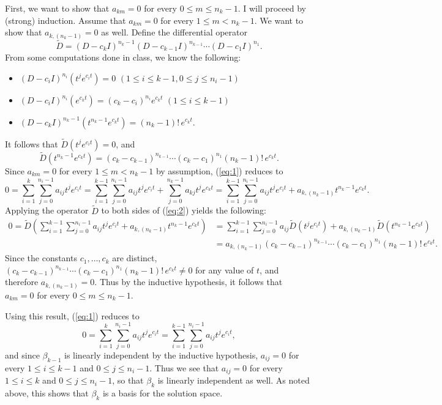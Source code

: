 \documentclass[12pt]{article}
\begin{document}
\begin{enumerate}
First, we want to show that $a_{km} = 0$ for every $0 \leq m \leq n_k-1$. I will proceed by (strong) induction. Assume that $a_{km} = 0$ for every $1 \leq m < n_k-1$. We want to show that $a_{k,(n_k-1)} = 0$ as well. Define the differential operator
\begin{equation*}
\widetilde{D} = (D-c_kI)^{n_k-1}(D-c_{k-1}I)^{n_{k-1}} \cdots (D-c_1I)^{n_1}.
\end{equation*}
From some computations done in class, we know the following:
\begin{itemize}
\item
$(D-c_iI)^{n_i}(t^je^{c_it}) = 0$ $(1 \leq i \leq k-1, 0 \leq j \leq n_i-1)$
\item
$(D-c_iI)^{n_i}(e^{c_kt}) = (c_k - c_i)^{n_i} e^{c_kt}$ $(1 \leq i \leq k-1)$
\item
$(D-c_kI)^{n_k-1}(t^{n_k-1}e^{c_kt}) = (n_k-1)! \, e^{c_kt}$.
\end{itemize}
It follows that $\widetilde{D}(t^je^{c_it}) = 0$, and
\begin{equation*}
\widetilde{D}(t^{n_k-1}e^{c_kt}) = (c_k-c_{k-1})^{n_{k-1}} \cdots (c_k-c_1)^{n_1} (n_k-1)! \, e^{c_kt}.
\end{equation*}
Since $a_{km} = 0$ for every $1 \leq m < n_k-1$ by assumption, (\ref{eq:1}) reduces to
\begin{equation} \label{eq:2}
0 = \sum_{i=1}^k \sum_{j=0}^{n_i-1} a_{ij} t^je^{c_it} = \sum_{i=1}^{k-1} \sum_{j=0}^{n_i-1} a_{ij} t^je^{c_it} + \sum_{j=0}^{n_k-1} a_{kj}t^j e^{c_kt} = \sum_{i=1}^{k-1} \sum_{j=0}^{n_i-1} a_{ij} t^je^{c_it} + a_{k,(n_k-1)}t^{n_k-1} e^{c_kt}.
\end{equation}
Applying the operator $\widetilde{D}$ to both sides of (\ref{eq:2}) yields the following:
\begin{align*}
0 = \widetilde{D}\left(\sum_{i=1}^{k-1} \sum_{j=0}^{n_i-1} a_{ij} t^je^{c_it} + a_{k,(n_k-1)}t^{n_k-1} e^{c_kt}\right)
&= \sum_{i=1}^{k-1} \sum_{j=0}^{n_i-1} a_{ij} \widetilde{D}(t^je^{c_it}) + a_{k,(n_k-1)}\widetilde{D}(t^{n_k-1} e^{c_kt}) \\
&= a_{k,(n_k-1)} (c_k-c_{k-1})^{n_{k-1}} \cdots (c_k-c_1)^{n_1} (n_k-1)! \, e^{c_kt}.
\end{align*}
Since the constants $c_1, \dots, c_k$ are distinct, $(c_k-c_{k-1})^{n_{k-1}} \cdots (c_k-c_1)^{n_1} (n_k-1)! \, e^{c_kt} \neq 0$ for any value of $t$, and therefore $a_{k,(n_k-1)} = 0$. Thus by the inductive hypothesis, it follows that $a_{km} = 0$ for every $0 \leq m \leq n_k-1$.

Using this result, (\ref{eq:1}) reduces to
\begin{equation*}
0 = \sum_{i=1}^k \sum_{j=0}^{n_i-1} a_{ij} t^je^{c_it} = \sum_{i=1}^{k-1} \sum_{j=0}^{n_i-1} a_{ij} t^je^{c_it},
\end{equation*}
and since $\beta_{k-1}$ is linearly independent by the inductive hypothesis, $a_{ij} = 0$ for every $1 \leq i \leq k-1$ and $0 \leq j \leq n_i-1$. Thus we see that $a_{ij} = 0$ for every $1 \leq i \leq k$ and $0 \leq j \leq n_i-1$, so that $\beta_k$ is linearly independent as well. As noted above, this shows that $\beta_k$ is a basis for the solution space.


\end{enumerate}
\end{document}
